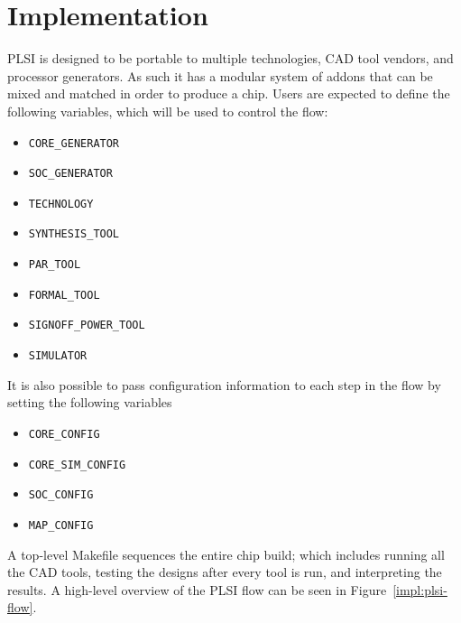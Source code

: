 \documentclass{article}
\begin{document}
\chapter{Implementation}

PLSI is designed to be portable to multiple technologies, CAD tool vendors, and
processor generators.  As such it has a modular system of addons that can be
mixed and matched in order to produce a chip.  Users are expected to define the
following variables, which will be used to control the flow:

\begin{itemize}
\item \texttt{CORE\_GENERATOR}
\item \texttt{SOC\_GENERATOR}
\item \texttt{TECHNOLOGY}
\item \texttt{SYNTHESIS\_TOOL}
\item \texttt{PAR\_TOOL}
\item \texttt{FORMAL\_TOOL}
\item \texttt{SIGNOFF\_POWER\_TOOL}
\item \texttt{SIMULATOR}
\end{itemize}

It is also possible to pass configuration information to each step in the flow
by setting the following variables

\begin{itemize}
\item \texttt{CORE\_CONFIG}
\item \texttt{CORE\_SIM\_CONFIG}
\item \texttt{SOC\_CONFIG}
\item \texttt{MAP\_CONFIG}
\end{itemize}

A top-level Makefile sequences the entire chip build; which includes running
all the CAD tools, testing the designs after every tool is run, and
interpreting the results.  A high-level overview of the PLSI flow can be seen
in Figure~\ref{impl:plsi-flow}.
\end{document}
